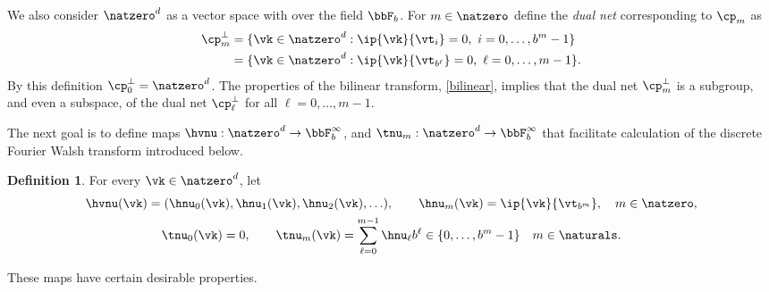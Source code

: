 \documentclass[]{elsarticle}
\theoremstyle{definition}
\newtheorem{defin}{Definition}
\renewcommand{\bbK}{\natzero^d}
\begin{document}
We also consider $\bbK$ as a vector space with over the field $\bbF_b$.  For $m \in \natzero$ define the \emph{dual net} corresponding to $\cp_m$ as  
\begin{align*}
\cp^{\perp}_m &= \{\vk \in \bbK : \ip{\vk}{\vt_i} = 0, \ i=0, \ldots, b^m-1\} \\
&= \{\vk \in \bbK : \ip{\vk}{\vt_{b^{\ell}}} = 0, \ \ell=0, \ldots, m-1\}.
\end{align*}
By this definition $\cp^{\perp}_{0}=\bbK$.  The properties of the bilinear transform, \eqref{bilinear}, implies that the dual net $\cp^{\perp}_m$ is a subgroup, and even a subspace, of the dual net $\cp^{\perp}_\ell$ for all $\ell=0, \ldots, m-1$.

The next goal is to define maps $\hvnu : \bbK \to \bbF_b^{\infty}$, and $\tnu_m : \bbK \to \bbF_b^{\infty}$ that facilitate calculation of the discrete Fourier Walsh transform introduced below. 

\begin{defin} \label{numapdef} For every $\vk \in \bbK$, let 
\begin{subequations} \label{numapdefeq}
\begin{gather}
\hvnu(\vk)=(\hnu_0(\vk), \hnu_1(\vk), \hnu_2(\vk), \ldots ), \qquad  \hnu_m(\vk)=\ip{\vk}{\vt_{b^m}}, \quad m \in \natzero, \\
\tnu_0(\vk) = 0, \qquad \tnu_m(\vk) = \sum_{\ell=0}^{m-1} \hnu_{\ell} b^{\ell} \in \{0, \ldots, b^{m}-1\} \quad m \in \naturals.
\end{gather}
\end{subequations}
\end{defin}

These maps have certain desirable properties.
\end{document}

